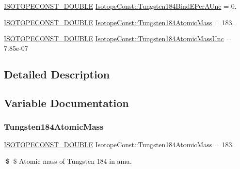 \begin{DoxyCompactItemize}
\mbox{\hyperlink{group___isotope_const-_macros_ga8f45a7272ce02c0b4c65c44636ed719a}{I\+S\+O\+T\+O\+P\+E\+C\+O\+N\+S\+T\+\_\+\+D\+O\+U\+B\+LE}} \mbox{\hyperlink{group___isotope_const-_tungsten-_w184_ga9be5637ec2c170ada0283973f230a0af}{Isotope\+Const\+::\+Tungsten184\+Bind\+E\+Per\+A\+Unc}} = 0.
\item 
\mbox{\hyperlink{group___isotope_const-_macros_ga8f45a7272ce02c0b4c65c44636ed719a}{I\+S\+O\+T\+O\+P\+E\+C\+O\+N\+S\+T\+\_\+\+D\+O\+U\+B\+LE}} \mbox{\hyperlink{group___isotope_const-_tungsten-_w184_ga664c0581556f934880e78b654760bbed}{Isotope\+Const\+::\+Tungsten184\+Atomic\+Mass}} = 183.
\item 
\mbox{\hyperlink{group___isotope_const-_macros_ga8f45a7272ce02c0b4c65c44636ed719a}{I\+S\+O\+T\+O\+P\+E\+C\+O\+N\+S\+T\+\_\+\+D\+O\+U\+B\+LE}} \mbox{\hyperlink{group___isotope_const-_tungsten-_w184_ga6017cb2efa73fc7ee740f99012b349fb}{Isotope\+Const\+::\+Tungsten184\+Atomic\+Mass\+Unc}} = 7.\+85e-\/07
\end{DoxyCompactItemize}


\subsection{Detailed Description}


\subsection{Variable Documentation}
\mbox{\label{group___isotope_const-_tungsten-_w184_ga664c0581556f934880e78b654760bbed}} 
\subsubsection{\texorpdfstring{Tungsten184\+Atomic\+Mass}{Tungsten184AtomicMass}}
{\footnotesize\ttfamily \mbox{\hyperlink{group___isotope_const-_macros_ga8f45a7272ce02c0b4c65c44636ed719a}{I\+S\+O\+T\+O\+P\+E\+C\+O\+N\+S\+T\+\_\+\+D\+O\+U\+B\+LE}} Isotope\+Const\+::\+Tungsten184\+Atomic\+Mass = 183.}

\$ \$ Atomic mass of Tungsten-\/184 in amu. \mbox{\label{group___isotope_const-_tungsten-_w184_ga6017cb2efa73fc7ee740f99012b349fb}} 
